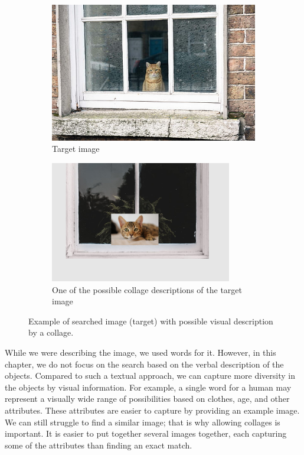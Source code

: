 \begin{figure}
\centering

\begin{subfigure}[t]{0.48\textwidth}
\includegraphics[width=0.95\linewidth]{img/cat_on_window} 
\caption{Target image}
\label{fig:searched_scene}
\end{subfigure}
\begin{subfigure}[t]{0.48\textwidth}
\includegraphics[width=0.95\linewidth]{img/cat_on_window_collage}
\caption{One of the possible collage descriptions of the target image}
\label{fig:collage_example}
\end{subfigure}

\caption{Example of searched image (target) with possible visual description by a collage.}
\label{fig:query_collage_comparison}
\end{figure}

While we were describing the image, we used words for it. However, in this chapter, we do not focus on the search based on the verbal description of the objects. Compared to such a textual approach, we can capture more diversity in the objects by visual information. For example, a single word for a human may represent a visually wide range of possibilities based on clothes, age, and other attributes. These attributes are easier to capture by providing an example image. We can still struggle to find a similar image; that is why allowing collages is important. It is easier to put together several images together, each capturing some of the attributes than finding an exact match.

